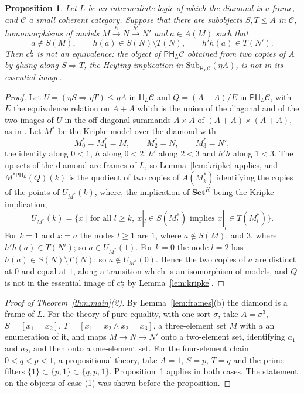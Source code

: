 \documentclass[11pt]{amsart}
\newtheorem{prop}[thm]{Proposition}
\theoremstyle{definition}
\newcommand{\Set}{\mathbf{Set}}
\newcommand{\Sub}{\mathrm{Sub}}
\newcommand{\PP}{\mathsf P}
\newcommand{\HH}{\mathsf H}
\newcommand{\cC}{\mathcal C}
\begin{document}
\begin{prop}\label{prop:diamond}
Let $L$ be an intermediate logic of which the diamond is a frame, and
$\cC$ a small coherent category. Suppose that there are subobjects
$S,T\le A$ in $\cC$, homomorphisms of models $M\xrightarrow{h}N
\xrightarrow{h'}N'$ and $a\in A(M)$ such that
\[
a\notin S(M),\qquad h(a)\in S(N)\setminus T(N),\qquad h'h(a)\in T(N').
\]
Then $c^L_\cC$ is not an equivalence: the object of $\PP\HH_L\cC$
obtained from two copies of $A$ by gluing along $S\Rightarrow T$, the
Heyting implication in $\Sub_{\HH_L\cC}(\eta A)$, is not
in its essential image.
\end{prop}
\begin{proof}
Let $U=(\eta S\Rightarrow\eta T)\le\eta A$ in $\HH_L\cC$ and $Q=(A+A)/E$
in $\PP\HH_L\cC$, with $E$ the equivalence relation on $A+A$ which is
the union of the diagonal and of the two images of $U$ in the
off-diagonal summands $A\times A$ of $(A+A)\times(A+A)$, as in
\cite[\S5]{Heyting}. Let
$M^\ast$ be the Kripke model over the diamond with
\[
M^\ast_0=M^\ast_1=M,\qquad M^\ast_2=N,\qquad M^\ast_3=N',
\]
the identity along $0<1$, $h$ along $0<2$, $h'$ along $2<3$ and $h'h$
along $1<3$. The up-sets of the diamond are frames of $L$, so
Lemma~\ref{lem:kripke} applies, and $M^{\ast\PP\HH_L}(Q)(k)$ is the
quotient of two copies of $A(M^\ast_k)$ identifying the copies of the
points of $U_{M^\ast}(k)$, where, the implication of $\Set^K$ being the
Kripke implication,
\[
U_{M^\ast}(k)=\{x\mid\text{for all }l\ge k,\ x|_l\in S(M^\ast_l)
\text{ implies }x|_l\in T(M^\ast_l)\}.
\]
For $k=1$ and $x=a$ the nodes $l\ge1$ are $1$, where $a\notin S(M)$,
and $3$, where $h'h(a)\in T(N')$; so $a\in U_{M^\ast}(1)$. For $k=0$
the node $l=2$ has $h(a)\in S(N)\setminus T(N)$; so $a\notin
U_{M^\ast}(0)$. Hence the two copies of $a$ are distinct at $0$ and
equal at $1$, along a transition which is an isomorphism of models,
and $Q$ is not in the essential image of $c^L_\cC$ by
Lemma~\ref{lem:kripke}.
\end{proof}

\begin{proof}[Proof of Theorem~\ref{thm:main}\textup{(2)}]
By Lemma~\ref{lem:frames}(b) the diamond is a frame of $L$. For the
theory of pure equality, with one sort $\sigma$, take
$A=\sigma^3$, $S=[x_1=x_2]$, $T=[x_1=x_2\wedge x_2=x_3]$, a
three-element set $M$ with $a$ an enumeration of it, and maps $M\to
N\to N'$ onto a two-element set, identifying $a_1$ and $a_2$, and then
onto a one-element set. For the four-element chain $0<q<p<1$, a
propositional theory, take $A=1$, $S=p$, $T=q$ and the prime filters
$\{1\}\subset\{p,1\}\subset\{q,p,1\}$. Proposition~\ref{prop:diamond}
applies in both cases. The statement on the objects of case (1) was
shown before the proposition.
\end{proof}
\end{document}
